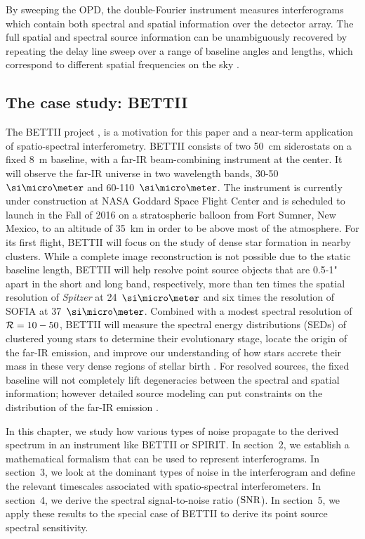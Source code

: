 By sweeping the OPD, the double-Fourier instrument measures interferograms which contain both spectral and spatial information over the detector array. The full spatial and spectral source information can be unambiguously recovered by repeating the delay line sweep over a range of baseline angles and lengths, which correspond to different spatial frequencies on the sky \citep{Mariotti:1988vea}.


\subsection{The case study: BETTII}

The BETTII project \citep{Rinehart:2014gk}, is a motivation for this paper and a near-term application of spatio-spectral interferometry. BETTII consists of two 50~cm siderostats on a fixed 8~m baseline, with a far-IR beam-combining instrument at the center. It will observe the far-IR universe in two 
wavelength bands, 30-50~$\um$ and 60-110~$\um$. The instrument is currently under construction at NASA Goddard Space Flight Center and is scheduled to launch in the Fall of 2016 on a stratospheric balloon from Fort Sumner, New Mexico, to an altitude of 35~km in order to be above most of the atmosphere. For its first flight, BETTII will focus on the study of dense star formation in nearby clusters. While a complete image reconstruction is not possible due to the static baseline length, BETTII will help resolve point source objects that are 0.5-1" apart in the short and long band, respectively, more than ten times the spatial resolution of \textit{Spitzer} at 24~$\um$ and six times the resolution of SOFIA at 37~$\um$.  Combined with a modest spectral resolution of $\mathcal{R}=10 - 50$, BETTII will measure the spectral energy distributions (SEDs) of clustered young stars to determine their evolutionary stage, locate the origin of the far-IR emission, and improve our understanding of how stars accrete their mass in these very dense regions of stellar birth \cite[e.g. see][and references therein]{2014prpl.conf..149T}. For resolved sources, the fixed baseline will not completely lift degeneracies between the spectral and spatial information; however detailed source modeling can put constraints on the distribution of the far-IR emission
\citep[e.g][]{Whitney:2013cw}.

In this chapter, we study how various types of noise propagate to the derived spectrum in an
instrument like BETTII or SPIRIT. In section~2, we establish a mathematical formalism that can be used to represent interferograms. In section~3, we look at the dominant types of noise in the interferogram and define the relevant timescales associated with spatio-spectral interferometers. In section~4, we derive the spectral signal-to-noise ratio ($\textrm{SNR}$). In section~5, we apply these results to the special case of BETTII to derive its point source spectral sensitivity.

